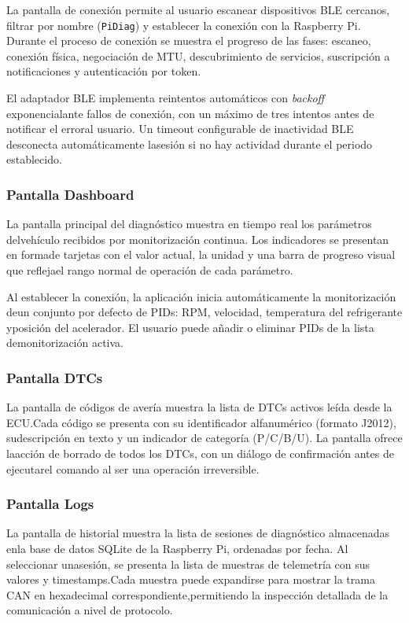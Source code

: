 La pantalla de conexión permite al usuario escanear dispositivos BLE cercanos, filtrar por nombre (\texttt{PiDiag}) y establecer la conexión con la Raspberry Pi. Durante el proceso de conexión se muestra el progreso de las fases: escaneo, conexión física, negociación de MTU, descubrimiento de servicios, suscripción a notificaciones y autenticación por token.

El adaptador BLE implementa reintentos automáticos con \textit{backoff} exponencialante fallos de conexión, con un máximo de tres intentos antes de notificar el erroral usuario. Un timeout configurable de inactividad BLE desconecta automáticamente lasesión si no hay actividad durante el periodo establecido.

\subsubsection{Pantalla Dashboard}

La pantalla principal del diagnóstico muestra en tiempo real los parámetros delvehículo recibidos por monitorización continua. Los indicadores se presentan en formade tarjetas con el valor actual, la unidad y una barra de progreso visual que reflejael rango normal de operación de cada parámetro.

Al establecer la conexión, la aplicación inicia automáticamente la monitorización deun conjunto por defecto de PIDs: RPM, velocidad, temperatura del refrigerante yposición del acelerador. El usuario puede añadir o eliminar PIDs de la lista demonitorización activa.

\subsubsection{Pantalla DTCs}

La pantalla de códigos de avería muestra la lista de DTCs activos leída desde la ECU.Cada código se presenta con su identificador alfanumérico (formato J2012), sudescripción en texto y un indicador de categoría (P/C/B/U). La pantalla ofrece laacción de borrado de todos los DTCs, con un diálogo de confirmación antes de ejecutarel comando al ser una operación irreversible.

\subsubsection{Pantalla Logs}

La pantalla de historial muestra la lista de sesiones de diagnóstico almacenadas enla base de datos SQLite de la Raspberry Pi, ordenadas por fecha. Al seleccionar unasesión, se presenta la lista de muestras de telemetría con sus valores y timestamps.Cada muestra puede expandirse para mostrar la trama CAN en hexadecimal correspondiente,permitiendo la inspección detallada de la comunicación a nivel de protocolo.

